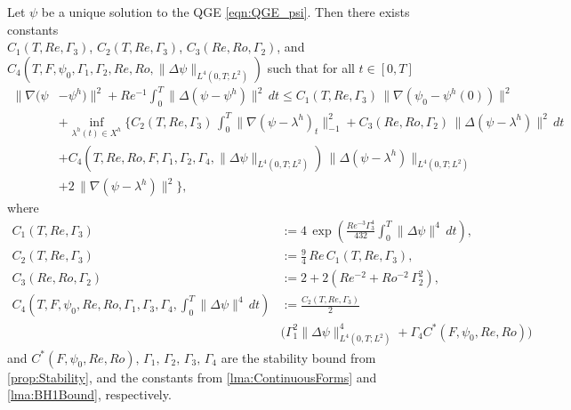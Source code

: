 \begin{thm} \label{thm:SemiConvergence}
  Let $\psi$ be a unique solution to the QGE \eqref{eqn:QGE_psi}. Then there
  exists constants \\ $C_1(T,Re,\Gamma_3)$, $C_2(T,Re,\Gamma_3)$,
  $C_3(Re,Ro,\Gamma_2)$, and $C_4(T, F, \psi_0, \Gamma_1, \Gamma_2, Re,
  Ro,\|\Delta \psi\|_{L^4(0,T;L^2)})$ such that for all $t\in [0,T]$
  \begin{equation}
    \begin{split}
      \|\nabla (\psi &- \psi^h) \|^2 + Re^{-1}
        \int_{0}^{T}\! \|\Delta (\psi - \psi^h)\|^2 \, dt
        \le C_1(T,Re,\Gamma_3)\,\|\nabla(\psi_0 - \psi^h(0))\|^2 \\
      & + \inf_{\lambda^h(t) \in X^h} \biggl\{
        C_2(T,Re,\Gamma_3)\,\int_0^T\! \|\nabla(\psi - \lambda^h)_t\|^2_{-1}
        + C_3(Re,Ro,\Gamma_2)\, \|\Delta(\psi - \lambda^h)\|^2\, dt \\
      & + C_4(T,Re,Ro,F,\Gamma_1,\Gamma_2,\Gamma_4, \|\Delta
        \psi\|_{L^4(0,T;L^2)})\,\|\Delta(\psi - \lambda^h)\|_{L^4(0,T;L^2)} \\
      & + 2\,\|\nabla (\psi - \lambda^h)\|^2\biggr\},
    \end{split}
    \label{eqn:SemiConvergence}
  \end{equation}
  where
  \begin{align}
    C_1(T,Re,\Gamma_3) &:= 4\, \exp\left(\frac{Re^{-3} \Gamma_3^4}{432}
      \int_{0}^{T}\! \|\Delta \psi\|^4\, dt\right), \label{eqn:C1}\\
    C_2(T,Re,\Gamma_3) &:= \frac{9}{4}\, Re\, C_1(T,Re,\Gamma_3), \label{eqn:C2}\\
    C_3(Re,Ro,\Gamma_2) &:= 2 + 2\left(Re^{-2} + Ro^{-2}\, \Gamma_2^2\right), \label{eqn:C3} \\
    C_4(T,F,\psi_0,Re,Ro,\Gamma_1,\Gamma_3,\Gamma_4,\int_{0}^{T}\! \|\Delta
    \psi\|^4\, dt) &:= \frac{C_2(T,Re,\Gamma_3)}{2} \\
      & \biggl(\Gamma_1^2 \|\Delta \psi\|^4_{L^4(0,T;L^2)} + \Gamma_4
        C^*(F,\psi_0,Re,Ro)\biggr) \label{eqn:C4}
  \end{align}
  and $C^*(F,\psi_0,Re,Ro),\, \Gamma_1,\, \Gamma_2,\, \Gamma_3,\, \Gamma_4$ are
  the stability bound from \autoref{prop:Stability}, and the constants from
  \autoref{lma:ContinuousForms} and \autoref{lma:BH1Bound}, respectively.
\end{thm}
